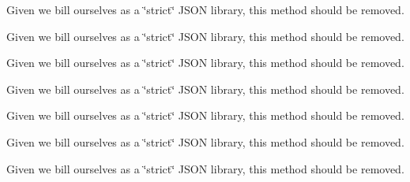 
\begin{DoxyRefList}
\item[\label{deprecated__deprecated000001}%
\hypertarget{deprecated__deprecated000001}{}%
\-Member \hyperlink{interface_g_h_async_test_case_a43422127c8303a93f0ae39c883a2da06}{\mbox{[}\-G\-H\-Async\-Test\-Case wait\-For\-:timeout\-:\mbox{]}} ]










































\item[\label{deprecated__deprecated000010}%
\hypertarget{deprecated__deprecated000010}{}%
\-Member \hyperlink{interface_s_b_j_s_o_n_aa88f7cb9ddc4ab7fd6e9fc0853e6da6a}{\mbox{[}\-S\-B\-J\-S\-O\-N fragment\-With\-String\-:error\-:\mbox{]}} ]\-Given we bill ourselves as a \char`\"{}strict\char`\"{} \-J\-S\-O\-N library, this method should be removed. 

\-Given we bill ourselves as a \char`\"{}strict\char`\"{} \-J\-S\-O\-N library, this method should be removed. 

\-Given we bill ourselves as a \char`\"{}strict\char`\"{} \-J\-S\-O\-N library, this method should be removed. 

\-Given we bill ourselves as a \char`\"{}strict\char`\"{} \-J\-S\-O\-N library, this method should be removed. 

\-Given we bill ourselves as a \char`\"{}strict\char`\"{} \-J\-S\-O\-N library, this method should be removed. 

\-Given we bill ourselves as a \char`\"{}strict\char`\"{} \-J\-S\-O\-N library, this method should be removed.  
\item[\label{deprecated__deprecated000009}%
\hypertarget{deprecated__deprecated000009}{}%
\-Member \hyperlink{interface_s_b_j_s_o_n_a942831fa293980ad189b72860055d32a}{\mbox{[}\-S\-B\-J\-S\-O\-N object\-With\-String\-:allow\-Scalar\-:error\-:\mbox{]}} ]\-Given we bill ourselves as a \char`\"{}strict\char`\"{} \-J\-S\-O\-N library, this method should be removed. 


\end{DoxyRefList}
